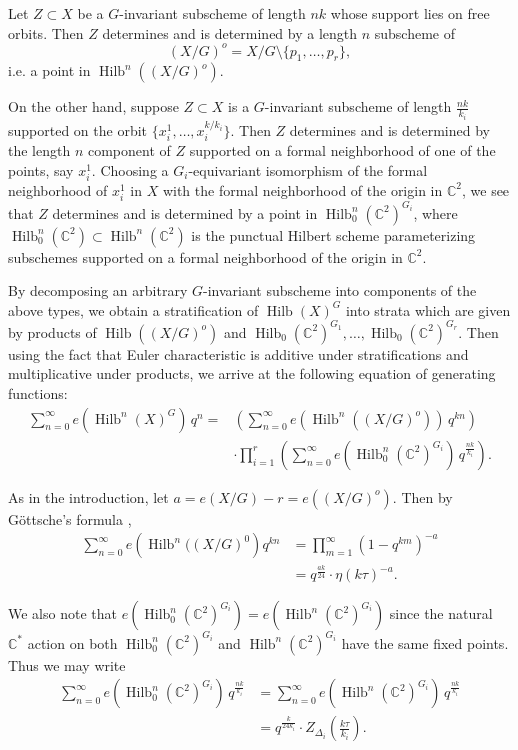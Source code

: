 \documentclass{amsart}
\theoremstyle{definition}
\newcommand{\CC} {{\mathbb C}}          %
\newcommand{\Hilb}{\operatorname{Hilb}}
\begin{document}
Let $Z\subset X$ be a $G$-invariant subscheme of length $nk$ whose
support lies on free orbits. Then $Z$ determines and is determined by
a length $n$ subscheme of 
\[
(X/G)^{o}  = X/G\setminus \{p_{1},\dotsc ,p_{r} \},
\]
i.e. a point
in $\Hilb^{n}((X/G)^{o})$.

On the other hand, suppose $Z\subset X$ is a $G$-invariant subscheme
of length $\frac{nk}{k_{i}}$ supported on the orbit
$\{x_{i}^{1},\dotsc ,x_{i}^{k/k_{i}} \}$. Then $Z$ determines and is
determined by the length $n$ component of $Z$ supported on a formal
neighborhood of one of the points, say $x_{i}^{1}$. Choosing a
$G_{i}$-equivariant isomorphism of the formal neighborhood of
$x_{i}^{1}$ in $X$ with the formal neighborhood of the origin in
$\CC^{2}$, we see that $Z$ determines and is determined by a point in
$\Hilb_{0}^{n}(\CC^{2})^{G_{i}}$, where $\Hilb_{0}^{n}(\CC^{2})\subset
\Hilb^{n}(\CC^{2})$ is the punctual Hilbert scheme parameterizing
subschemes supported on a formal neighborhood of the origin in
$\CC^{2}$.

By decomposing an arbitrary $G$-invariant subscheme into components of
the above types, we obtain a stratification of $\Hilb (X)^{G}$ into
strata which are given by products of $\Hilb ((X/G)^{o})$ and
$\Hilb_{0}(\CC^{2})^{G_{1}},\dotsc ,\Hilb_{0}(\CC^{2})^{G_{r}}$. Then
using the fact that Euler characteristic is additive under
stratifications and multiplicative under products, we arrive at the
following equation of generating functions:
\begin{align}\label{eqn: stratification formula for sum e(hilb(X)G)}
\nonumber\sum_{n=0}^{\infty} e\left(\Hilb^{n}(X)^{G} \right)\, q^{n}
=&\left(\sum_{n=0}^{\infty} e\left(\Hilb^{n}((X/G)^{o}) \right)\,
q^{kn} \right)\\
& \cdot \prod_{i=1}^{r}\left( \sum_{n=0}^{\infty}
e\left(\Hilb_{0}^{n}(\CC^{2})^{G_{i}} \right) \, q^{\frac{nk}{k_{i}}}
\right) .
\end{align}

As in the introduction, let $a = e(X/G)-r=e\left((X/G)^{o}
\right)$. Then by G\"ottsche's formula \cite{gottsche1990betti},
\begin{align*}
\sum_{n=0}^{\infty} e\left(\Hilb^{n}((X/G)^{0} \right) q^{kn} &=
\prod_{m=1}^{\infty} (1-q^{km})^{-a}\\
&= q^{\frac{ak}{24}} \cdot \eta (k\tau )^{-a}. 
\end{align*}

We also note that $e\left(\Hilb_{0}^{n}(\CC^{2})^{G_{i}}
\right)=e\left(\Hilb^{n}(\CC^{2})^{G_{i}} \right)$ since the natural
$\CC^{*}$ action on both $\Hilb_{0}^{n}(\CC^{2})^{G_{i}}$ and
$\Hilb^{n}(\CC^{2})^{G_{i}}$ have the same fixed points. Thus we may
write
\begin{align*}
\sum_{n=0}^{\infty} e\left(\Hilb_{0}^{n}(\CC^{2})^{G_{i}} \right) \,
q^{\frac{nk}{k_{i}}} &= \sum_{n=0}^{\infty} e\left(\Hilb^{n}(\CC^{2})^{G_{i}} \right) \,
q^{\frac{nk}{k_{i}}}\\
&= q^{\frac{k}{24k_{i}}} \cdot Z_{\Delta_{i}} \left(\frac{k\tau}{k_{i}}
\right) .
\end{align*}
\end{document}
